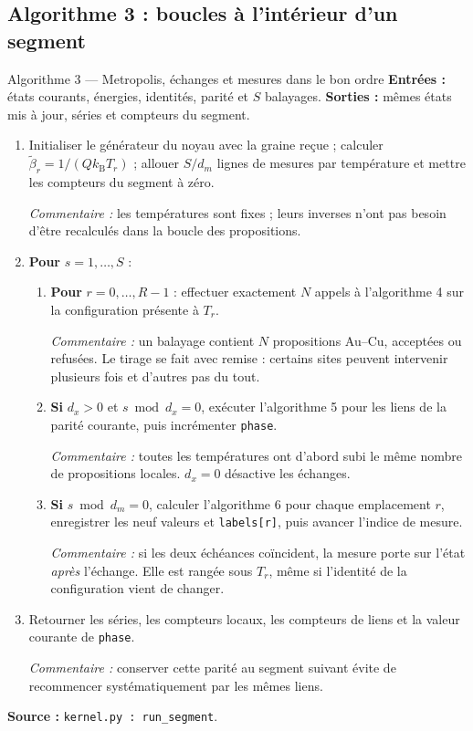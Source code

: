 \documentclass[10pt,a4paper]{article}
\newcommand{\kb}{k_{\mathrm B}}
\begin{document}
\subsection{Algorithme 3 : boucles à l'intérieur d'un segment}
\begin{algocode}{Algorithme 3 --- Metropolis, échanges et mesures dans le bon ordre}
\textbf{Entrées :} états courants, énergies, identités, parité et $S$ balayages.
\textbf{Sorties :} mêmes états mis à jour, séries et compteurs du segment.
\begin{enumerate}
\item Initialiser le générateur du noyau avec la graine reçue ; calculer
$\widetilde\beta_r=1/(Q\kb T_r)$ ; allouer $S/d_m$ lignes de mesures par
température et mettre les compteurs du segment à zéro.
\par\textit{Commentaire :} les températures sont fixes ; leurs inverses
n'ont pas besoin d'être recalculés dans la boucle des propositions.
\item \textbf{Pour} $s=1,\ldots,S$ :
\begin{enumerate}
\item \textbf{Pour} $r=0,\ldots,R-1$ : effectuer exactement $N$ appels à
l'algorithme 4 sur la configuration présente à $T_r$.
\par\textit{Commentaire :} un balayage contient $N$ propositions Au--Cu,
acceptées ou refusées. Le tirage se fait avec remise : certains sites
peuvent intervenir plusieurs fois et d'autres pas du tout.
\item \textbf{Si} $d_x>0$ et $s\bmod d_x=0$, exécuter l'algorithme 5
pour les liens de la parité courante, puis incrémenter \texttt{phase}.
\par\textit{Commentaire :} toutes les températures ont d'abord subi le
même nombre de propositions locales. $d_x=0$ désactive les échanges.
\item \textbf{Si} $s\bmod d_m=0$, calculer l'algorithme 6 pour chaque
emplacement $r$, enregistrer les neuf valeurs et \texttt{labels[r]},
puis avancer l'indice de mesure.
\par\textit{Commentaire :} si les deux échéances coïncident, la mesure
porte sur l'état \emph{après} l'échange. Elle est rangée sous $T_r$, même
si l'identité de la configuration vient de changer.
\end{enumerate}
\item Retourner les séries, les compteurs locaux, les compteurs de liens
et la valeur courante de \texttt{phase}.
\par\textit{Commentaire :} conserver cette parité au segment suivant évite
de recommencer systématiquement par les mêmes liens.
\end{enumerate}
\textbf{Source :} \texttt{kernel.py : run\_segment}.
\end{algocode}
\end{document}
